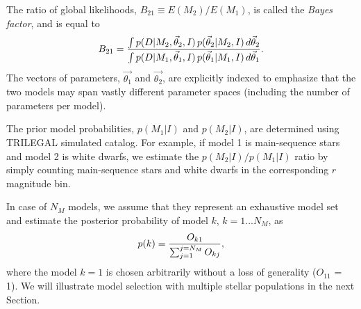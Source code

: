 The ratio of global likelihoods, $B_{21}\equiv E(M_2)/E(M_1)$, is called the {\it Bayes factor}, and
is equal to 
\begin{equation}
     B_{21} = {\int p(D|M_2,\vec{\theta}_2,I) \, p(\vec{\theta}_2|M_2,I) \, d \vec{\theta}_2 \over
                    \int p(D|M_1,\vec{\theta}_1,I) \, p(\vec{\theta}_1|M_1,I) \, d \vec{\theta}_1}.
\end{equation}
The vectors of parameters, $\vec{\theta_1}$ and $\vec{\theta_2}$, are explicitly indexed to emphasize
that the two models may span vastly different parameter spaces (including the  number of
parameters per model).

The prior model probabilities, $p(M_1|I)$ and $p(M_2|I)$, are determined using TRILEGAL simulated catalog.
For example, if model 1 is main-sequence stars and model 2 is white dwarfs, we estimate the $p(M_2|I)/p(M_1|I)$
ratio by simply counting main-sequence stars and white dwarfs in the corresponding $r$ magnitude bin. 

In case of $N_M$ models, we assume that they represent an exhaustive model set and estimate the posterior
probability of model $k$, $k=1...N_M$, as
\begin{equation}
                 p(k) = { O_{k1}  \over \sum_{j=1}^{j=N_M}  O_{kj}},
\end{equation}
where the model $k=1$ is chosen arbitrarily without a loss of generality ($O_{11}$ = 1). We will illustrate model
selection with multiple stellar populations in the next Section.



